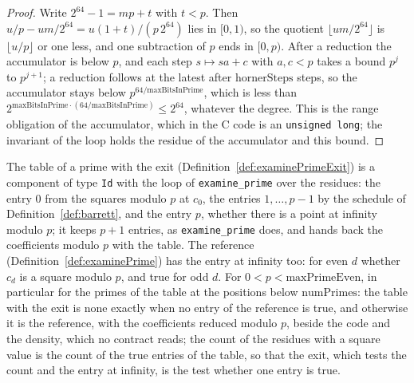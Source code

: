 \begin{proof}
  \leanok
  Write $2^{64} - 1 = m p + t$ with $t < p$. Then $u/p - u m/2^{64} = u (1 + t)/(p\, 2^{64})$ lies
  in $[0, 1)$, so the quotient $\lfloor u m / 2^{64} \rfloor$ is $\lfloor u / p \rfloor$ or one
  less, and one subtraction of $p$ ends in $[0, p)$. After a reduction the accumulator is below $p$,
  and each step $s \mapsto s a + c$ with $a, c < p$ takes a bound $p^j$ to $p^{j + 1}$; a reduction
  follows at the latest after $\mathrm{hornerSteps}$ steps, so the accumulator stays below
  $p^{64 / \mathrm{maxBitsInPrime}}$, which is less than
  $2^{\mathrm{maxBitsInPrime} \cdot (64 / \mathrm{maxBitsInPrime})} \le 2^{64}$, whatever the
  degree. This is the range obligation of the accumulator, which in the C code is an
  \verb|unsigned long|; the invariant of the loop holds the residue of the accumulator and this
  bound.
\end{proof}

\begin{lemma}\label{lem:examinePrime_eq}
  \leanok
  The table of a prime with the exit (Definition~\ref{def:examinePrimeExit}) is a component of type
  \verb|Id| with the loop of \verb|examine_prime| over the residues: the entry $0$ from the squares
  modulo $p$ at $c_0$, the entries $1, \dots, p - 1$ by the schedule of
  Definition~\ref{def:barrett}, and the entry $p$, whether there is a point at infinity modulo $p$;
  it keeps $p + 1$ entries, as \verb|examine_prime| does, and hands back the coefficients modulo $p$
  with the table. The reference (Definition~\ref{def:examinePrime}) has the entry at infinity too:
  for even $d$ whether $c_d$ is a square modulo $p$, and true for odd $d$. For
  $0 < p < \mathrm{maxPrimeEven}$, in particular for the primes of the table at the positions below
  $\mathrm{numPrimes}$: the table with the exit is none exactly when no entry of the reference is
  true, and otherwise it is the reference, with the coefficients reduced modulo $p$, beside the code
  and the density, which no contract reads; the count of the residues with a square value is the
  count of the true entries of the table, so that the exit, which tests the count and the entry at
  infinity, is the test whether one entry is true.
\end{lemma}

